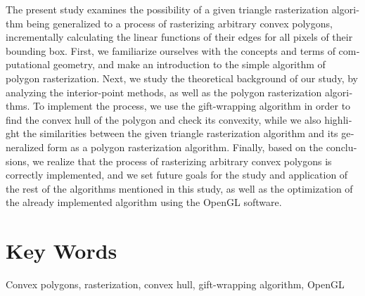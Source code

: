 \textlatin{The present study examines the possibility of a given triangle rasterization algorithm being generalized to a process of rasterizing arbitrary convex polygons, incrementally calculating the linear functions of their edges for all pixels of their bounding box. First, we familiarize ourselves with the concepts and terms of computational geometry, and make an introduction to the simple algorithm of polygon rasterization. Next, we study the theoretical background of our study, by analyzing the interior-point methods, as well as the polygon rasterization algorithms. To implement the process, we use the gift-wrapping algorithm in order to find the convex hull of the polygon and check its convexity, while we also highlight the similarities between the given triangle rasterization algorithm and its generalized form as a polygon rasterization algorithm. Finally, based on the conclusions, we realize that the process of rasterizing arbitrary convex polygons is correctly implemented, and we set future goals for the study and application of the rest of the algorithms mentioned in this study, as well as the optimization of the already implemented algorithm using the OpenGL software.}

\vspace{1.5em}

\section*{\textlatin{Key Words}}
\textlatin{Convex polygons, rasterization, convex hull, gift-wrapping algorithm, OpenGL}
